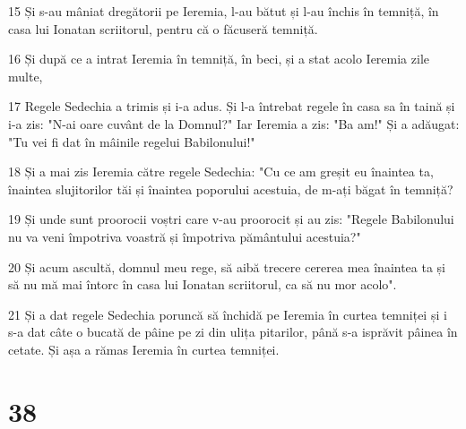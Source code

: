 \par 15 Și s-au mâniat dregătorii pe Ieremia, l-au bătut și l-au închis în temniță, în casa lui Ionatan scriitorul, pentru că o făcuseră temniță.
\par 16 Și după ce a intrat Ieremia în temniță, în beci, și a stat acolo Ieremia zile multe,
\par 17 Regele Sedechia a trimis și i-a adus. Și l-a întrebat regele în casa sa în taină și i-a zis: "N-ai oare cuvânt de la Domnul?" Iar Ieremia a zis: "Ba am!" Și a adăugat: "Tu vei fi dat în mâinile regelui Babilonului!"
\par 18 Și a mai zis Ieremia către regele Sedechia: "Cu ce am greșit eu înaintea ta, înaintea slujitorilor tăi și înaintea poporului acestuia, de m-ați băgat în temniță?
\par 19 Și unde sunt proorocii voștri care v-au proorocit și au zis: "Regele Babilonului nu va veni împotriva voastră și împotriva pământului acestuia?"
\par 20 Și acum ascultă, domnul meu rege, să aibă trecere cererea mea înaintea ta și să nu mă mai întorc în casa lui Ionatan scriitorul, ca să nu mor acolo".
\par 21 Și a dat regele Sedechia poruncă să închidă pe Ieremia în curtea temniței și i s-a dat câte o bucată de pâine pe zi din ulița pitarilor, până s-a isprăvit pâinea în cetate. Și așa a rămas Ieremia în curtea temniței.

\chapter{38}

